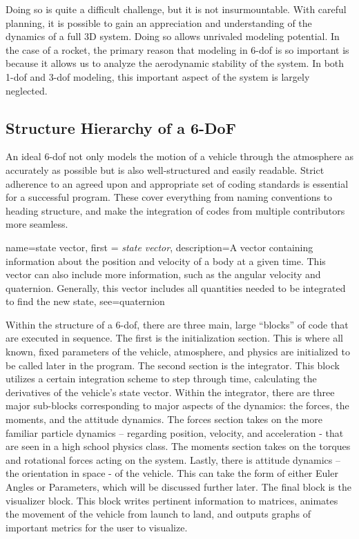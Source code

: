 \documentclass[12pt]{report}
\begin{document}
Doing so is quite a difficult challenge, but it is not insurmountable. With careful planning, it is possible to gain an appreciation and understanding of the dynamics of a full 3D system. Doing so allows unrivaled modeling potential. In the case of a rocket, the primary reason that modeling in 6-\gls{dof} is so important is because it allows us to analyze the aerodynamic stability of the system. In both 1-\gls{dof} and 3-\gls{dof} modeling, this important aspect of the system is largely neglected.
\subsection{Structure Hierarchy of a 6-DoF}
An ideal 6-\gls{dof} not only models the motion of a vehicle through the atmosphere as accurately as possible but is also well-structured and easily readable. Strict adherence to an agreed upon and appropriate set of coding standards is essential for a successful program. These cover everything from naming conventions to heading structure, and make the integration of codes from multiple contributors more seamless.

{
    name=state vector,
    first = {\textit{state vector}},
    description={A vector containing information about the position and velocity of a body at a given time. This vector can also include more information, such as the angular velocity and quaternion. Generally, this vector includes all quantities needed to be integrated to find the new state},
    see={quaternion}
}

Within the structure of a 6-\gls{dof}, there are three main, large “blocks” of code that are executed in sequence. The first is the initialization section. This is where all known, fixed parameters of the vehicle, atmosphere, and physics are initialized to be called later in the program. The second section is the integrator. This block utilizes a certain integration scheme to step through time, calculating the derivatives of the vehicle’s \gls{state vector}. Within the integrator, there are three major sub-blocks corresponding to major aspects of the dynamics: the forces, the moments, and the attitude dynamics. The forces section takes on the more familiar particle dynamics – regarding position, velocity, and acceleration - that are seen in a high school physics class. The moments section takes on the torques and rotational forces acting on the system. Lastly, there is  attitude dynamics – the orientation in space - of the vehicle. This can take the form of either Euler Angles or Parameters, which will be discussed further later. The final block is the visualizer block. This block writes pertinent information to matrices, animates the movement of the vehicle from launch to land, and outputs graphs of important metrics for the user to visualize.
\end{document}
